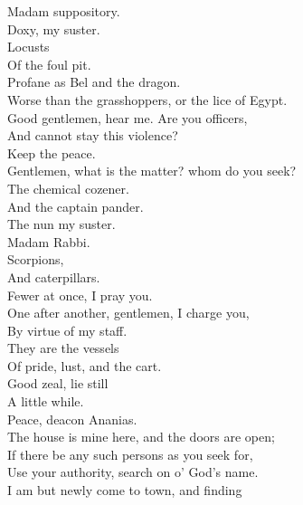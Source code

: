 \documentclass[a4paper,oneside]{memoir}
\begin{document}
\begin{drama*}
\mammonspeaks Madam suppository.\\
\kastrilspeaks {} Doxy, my suster.\\
\ananiasspeaks {} Locusts\\
Of the foul pit.\\
\tribulationspeaks {} Profane as Bel and the dragon.\\
\ananiasspeaks Worse than the grasshoppers, or the lice of Egypt.\\
\lovewitspeaks Good gentlemen, hear me. Are you officers,\\
And cannot stay this violence?\\
\officeronespeaks {} Keep the peace.\\
\lovewitspeaks Gentlemen, what is the matter? whom do you seek?\\
\mammonspeaks The chemical cozener.\\
\surlyspeaks {} And the captain pander.\\
\kastrilspeaks The nun my suster.\\
\mammonspeaks {} Madam Rabbi.\\
\ananiasspeaks {} Scorpions,\\
And caterpillars.\\
\lovewitspeaks {} Fewer at once, I pray you.\\
\officertwospeaks One after another, gentlemen, I charge you,\\
By virtue of my staff.\\
\ananiasspeaks {} They are the vessels\\
Of pride, lust, and the cart.\\
\lovewitspeaks {} Good zeal, lie still\\
A little while.\\
\tribulationspeaks {} Peace, deacon Ananias.\\
\lovewitspeaks The house is mine here, and the doors are open;\\
If there be any such persons as you seek for,\\
Use your authority, search on o' God's name.\\
I am but newly come to town, and finding\\

\end{drama*}
\end{document}
